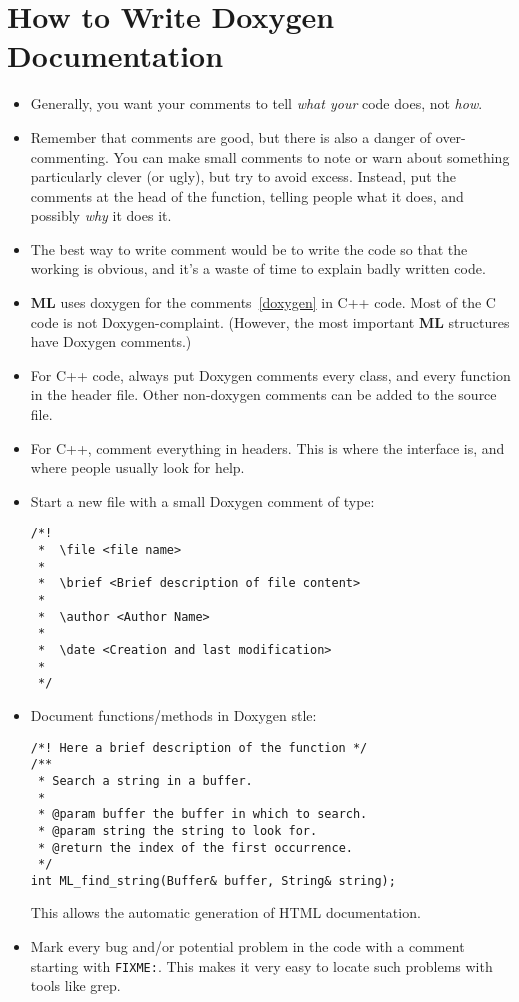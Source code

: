 \documentclass[10pt,letter,relax]{SANDreport}
\newcommand{\ML}     {{\bf ML }}
\begin{document}

\section{How to Write Doxygen Documentation}
\label{sec:doxygen}

\begin{itemize}
\item Generally, you want your comments to tell {\sl what your} code
  does, not {\sl how}.  
\item Remember that comments are good, but there is also a danger of
  over-commenting. You can make small comments to note or warn about
  something particularly clever (or ugly), but try to avoid excess.
  Instead, put the comments at the head of the function, telling people
  what it does, and possibly {\sl why} it does it.
\item The best way to write comment would be to write the code so that
  the working is obvious, and it's a waste of time to explain badly
  written code.
\item \ML uses doxygen for the comments~\ref{doxygen} in C++ code. Most
  of the C code is not Doxygen-complaint. (However, the most important
  \ML structures have Doxygen comments.)
\item For C++ code, always put Doxygen comments every class, and every
  function in the header file.  Other non-doxygen comments can be added
  to the source file.
\item For C++, comment everything in headers. This is where the
  interface is, and where people usually look for help.
\item Start a new file with a small Doxygen comment of type:
\begin{verbatim}
/*!
 *  \file <file name>
 *
 *  \brief <Brief description of file content>
 *
 *  \author <Author Name>
 *
 *  \date <Creation and last modification>
 *
 */
\end{verbatim}
\item Document functions/methods in Doxygen stle:
\begin{verbatim}
/*! Here a brief description of the function */
/**
 * Search a string in a buffer.
 *
 * @param buffer the buffer in which to search.
 * @param string the string to look for.
 * @return the index of the first occurrence.
 */
int ML_find_string(Buffer& buffer, String& string);
\end{verbatim}
This allows the automatic generation of HTML documentation. 
\item Mark every bug and/or potential problem in the code with a comment
  starting with \verb!FIXME:!. This makes it very easy to locate such
  problems with tools like grep.
\end{itemize}
\end{document}
